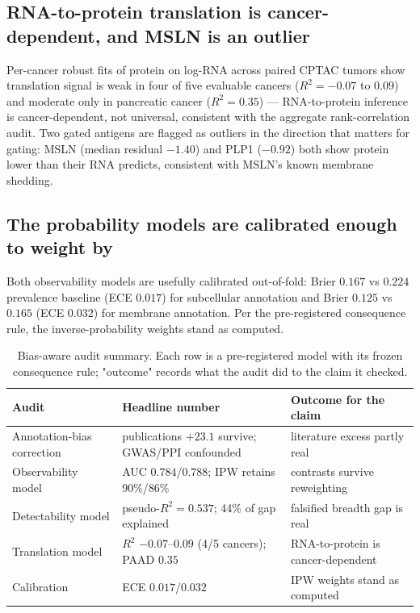 \documentclass[11pt]{article}
\begin{document}
\subsection{RNA-to-protein translation is cancer-dependent, and MSLN is an outlier}
Per-cancer robust fits of protein on log-RNA across paired CPTAC tumors show
translation signal is weak in four of five evaluable cancers
($R^2=-0.07$ to $0.09$) and moderate only in pancreatic cancer ($R^2=0.35$)
--- RNA-to-protein inference is cancer-dependent, not universal, consistent
with the aggregate rank-correlation audit. Two gated antigens are flagged as
outliers in the direction that matters for gating: MSLN (median residual
$-1.40$) and PLP1 ($-0.92$) both show protein lower than their RNA predicts,
consistent with MSLN's known membrane shedding.

\subsection{The probability models are calibrated enough to weight by}
Both observability models are usefully calibrated out-of-fold: Brier $0.167$
vs $0.224$ prevalence baseline (ECE $0.017$) for subcellular annotation and
Brier $0.125$ vs $0.165$ (ECE $0.032$) for membrane annotation. Per the
pre-registered consequence rule, the inverse-probability weights stand as
computed.

\begin{table}[t]\centering\footnotesize
\caption{Bias-aware audit summary. Each row is a pre-registered model with its
frozen consequence rule; "outcome" records what the audit did to the claim it
checked.}\label{tab:biasaudit}
\begin{tabular}{lll}
\toprule
Audit & Headline number & Outcome for the claim \\
\midrule
Annotation-bias correction & publications $+23.1$ survive; GWAS/PPI confounded & literature excess partly real \\
Observability model & AUC $0.784$/$0.788$; IPW retains 90\%/86\% & contrasts survive reweighting \\
Detectability model & pseudo-$R^2=0.537$; 44\% of gap explained & falsified breadth gap is real \\
Translation model & $R^2$ $-0.07$--$0.09$ (4/5 cancers); PAAD $0.35$ & RNA-to-protein is cancer-dependent \\
Calibration & ECE $0.017$/$0.032$ & IPW weights stand as computed \\
\bottomrule
\end{tabular}
\end{table}
\end{document}
